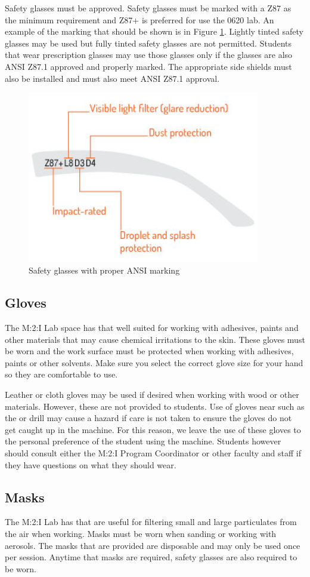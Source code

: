 Safety glasses must be  approved.  Safety glasses must be marked with a Z87 as the minimum requirement and Z87+ is preferred for use the 0620 lab.  An example of the marking that should be shown is in Figure \ref{fig:ansi}.  Lightly tinted safety glasses may be used but fully tinted safety glasses are not permitted.  Students that wear prescription glasses may use those glasses only if the glasses are also ANSI Z87.1 approved and properly marked.  The appropriate side shields must also be installed and must also meet ANSI Z87.1 approval.

\begin{figure}[ht]
\centering
\includegraphics[width=4in]{images/ansi-z871.jpg}
\caption{Safety glasses with proper ANSI marking}
\label{fig:ansi}
\end{figure}

\subsection{Gloves}
The M:2:I Lab space has  that well suited for working with adhesives, paints and other materials that may cause chemical irritations to the skin.  These gloves  must be worn and the work surface must be protected when working with adhesives, paints or other solvents. Make sure you select the correct glove size for your hand so they are comfortable to use.

Leather or cloth gloves may be used if desired when working with wood or other materials.  However, these are not provided to students.  Use of gloves near  such as the  or drill may cause a hazard if care is not taken to ensure the gloves do not get caught up in the machine.  For this reason, we leave the use of these gloves to the personal preference of the student using the machine.  Students however should consult either the M:2:I Program Coordinator or other faculty and staff if they have questions on what they should wear.  

\subsection{Masks}
The M:2:I Lab has  that are useful for filtering small and large particulates from the air when working.  Masks must be worn when sanding or working with aerosols. The masks that are provided are disposable and may only be used once per session.  Anytime that masks are required, safety glasses are also required to be worn.
